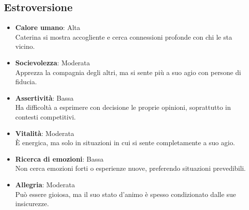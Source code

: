 \subsection*{Estroversione}
\begin{itemize}
    \item \textbf{Calore umano}: Alta \\
    Caterina si mostra accogliente e cerca connessioni profonde con chi le sta vicino.
    
    \item \textbf{Socievolezza}: Moderata \\
    Apprezza la compagnia degli altri, ma si sente più a suo agio con persone di fiducia.
    
    \item \textbf{Assertività}: Bassa \\
    Ha difficoltà a esprimere con decisione le proprie opinioni, soprattutto in contesti competitivi.
    
    \item \textbf{Vitalità}: Moderata \\
    È energica, ma solo in situazioni in cui si sente completamente a suo agio.
    
    \item \textbf{Ricerca di emozioni}: Bassa \\
    Non cerca emozioni forti o esperienze nuove, preferendo situazioni prevedibili.
    
    \item \textbf{Allegria}: Moderata \\
    Può essere gioiosa, ma il suo stato d'animo è spesso condizionato dalle sue insicurezze.
\end{itemize}

